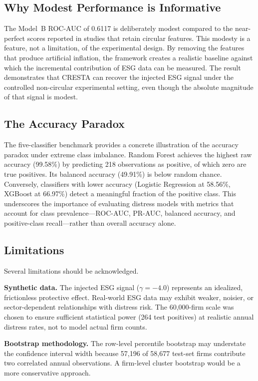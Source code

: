 \documentclass[sigconf,anonymous]{acmart}
\begin{document}
\subsection{Why Modest Performance is Informative}
The Model~B ROC-AUC of 0.6117 is deliberately modest compared to the near-perfect scores reported in studies that retain circular features. This modesty is a feature, not a limitation, of the experimental design. By removing the features that produce artificial inflation, the framework creates a realistic baseline against which the incremental contribution of ESG data can be measured. The result demonstrates that CRESTA can recover the injected ESG signal under the controlled non-circular experimental setting, even though the absolute magnitude of that signal is modest.

\subsection{The Accuracy Paradox}
The five-classifier benchmark provides a concrete illustration of the accuracy paradox under extreme class imbalance. Random Forest achieves the highest raw accuracy (99.58\%) by predicting 218 observations as positive, of which zero are true positives. Its balanced accuracy (49.91\%) is below random chance. Conversely, classifiers with lower accuracy (Logistic Regression at 58.56\%, XGBoost at 66.97\%) detect a meaningful fraction of the positive class. This underscores the importance of evaluating distress models with metrics that account for class prevalence---ROC-AUC, PR-AUC, balanced accuracy, and positive-class recall---rather than overall accuracy alone.

\subsection{Limitations}
Several limitations should be acknowledged.

\textbf{Synthetic data.} The injected ESG signal ($\gamma = -4.0$) represents an idealized, frictionless protective effect. Real-world ESG data may exhibit weaker, noisier, or sector-dependent relationships with distress risk. The 60,000-firm scale was chosen to ensure sufficient statistical power (264 test positives) at realistic annual distress rates, not to model actual firm counts.

\textbf{Bootstrap methodology.} The row-level percentile bootstrap may understate the confidence interval width because 57,196 of 58,677 test-set firms contribute two correlated annual observations. A firm-level cluster bootstrap would be a more conservative approach.
\end{document}
